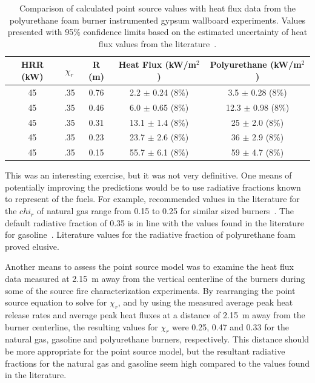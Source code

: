 \documentclass[twoside]{uocthesis}
\begin{document}
{\begin{table}
	\centering
	\footnotesize
	\begin{tabular}{|c|c|c|c|c|}
	\hline
		HRR (kW) &   $\chi_r$   & R (m)	     & Heat Flux (kW/m$^2$)     &  Polyurethane (kW/m$^2$)    	\\ \hline 
		45       &   .35 		& 0.76 	     & 2.2 $\pm$ 0.24 (8\%) 	&  3.5 $\pm$ 0.28 (8\%) 	   	 \\
		45       &   .35    	& 0.46	     & 6.0 $\pm$ 0.65 (8\%) 	&  12.3 $\pm$ 0.98 (8\%)  	     \\
		45       &   .35 		& 0.31	     & 13.1 $\pm$ 1.4 (8\%) 	&  25 $\pm$ 2.0 (8\%)   	      \\
        45       &   .35 		& 0.23	     & 23.7 $\pm$ 2.6 (8\%) 	&  36 $\pm$ 2.9 (8\%)		      \\
        45       &   .35 		& 0.15	     & 55.7 $\pm$ 6.1 (8\%) 	&  59 $\pm$ 4.7 (8\%)   	       \\
	\hline
	\end{tabular}
	\caption[Comparison of calculated point source values (HRR = 45~kW) with heat flux data from the instrumented gypsum wallboard experiments.]{Comparison of calculated point source values with heat flux data from the polyurethane foam burner instrumented gypsum wallboard experiments. Values presented with 95\% confidence limits based on the estimated uncertainty of heat flux values from the literature~\cite{Bryant:2003,Pitts:2006}.}
	\label{tab:Point_Source_HFPUF}
\end{table}

This was an interesting exercise, but it was not very definitive.  One means of potentially improving the predictions would be to use radiative fractions known to represent of the fuels. For example, recommended values in the literature for the $chi_r$ of natural gas range from 0.15 to 0.25 for similar sized burners~\cite{Hostikka:3,McCaffrey:1982}.  The default radiative fraction of 0.35 is in line with the values found in the literature for gasoline~\cite{Hamins:1991,McGrattan:2000}.  Literature values for the radiative fraction of polyurethane foam proved elusive. 

Another means to assess the point source model was to examine the heat flux data measured at 2.15~m away from the vertical centerline of the burners during some of the source fire characterization experiments. By rearranging the point source equation to solve for $\chi_r$, and by using the measured average peak heat release rates and average peak heat fluxes at a distance of 2.15~m away from the burner centerline, the resulting values for $\chi_r$ were 0.25, 0.47 and 0.33 for the natural gas, gasoline and polyurethane burners, respectively.  This distance should be more appropriate for the point source model, but the resultant radiative fractions for the natural gas and gasoline seem high compared to the values found in the literature.  

}
\end{document}
